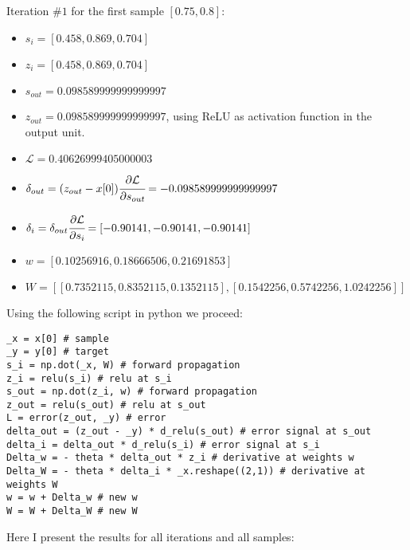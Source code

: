 \documentclass[10pt]{article}
\begin{document}
Iteration $\# 1$ for the first sample $[0.75, 0.8]$:\\
\begin{itemize}
\item $s_i = [ 0.458,  0.869,  0.704]$
\item $z_i = [ 0.458,  0.869,  0.704]$
\item $s_{out} = 0.098589999999999997$
\item $z_{out} = 0.098589999999999997$, using ReLU as activation function in the
output unit.
\item $\mathcal{L} = 0.40626999405000003$
\item $\delta_{out} = (z_{out} - x[0]) \cfrac{\partial \mathcal{L}}{\partial s_{out}} = -0.098589999999999997$
\item $\delta_{i} =  \delta_{out} \cfrac{\partial \mathcal{L}}{\partial s_{i}} = [-0.90141, -0.90141, -0.90141]$
\item $w = [ 0.10256916,  0.18666506,  0.21691853]$
\item $W = [[ 0.7352115,  0.8352115,  0.1352115],
        [ 0.1542256,  0.5742256,  1.0242256]]$
\end{itemize}
Using the following script in python we proceed:
\begin{verbatim}
_x = x[0] # sample
_y = y[0] # target
s_i = np.dot(_x, W) # forward propagation
z_i = relu(s_i) # relu at s_i
s_out = np.dot(z_i, w) # forward propagation
z_out = relu(s_out) # relu at s_out
L = error(z_out, _y) # error
delta_out = (z_out - _y) * d_relu(s_out) # error signal at s_out
delta_i = delta_out * d_relu(s_i) # error signal at s_i
Delta_w = - theta * delta_out * z_i # derivative at weights w
Delta_W = - theta * delta_i * _x.reshape((2,1)) # derivative at weights W
w = w + Delta_w # new w
W = W + Delta_W # new W
\end{verbatim}
Here I present the results for all iterations and all samples:
\end{document}
